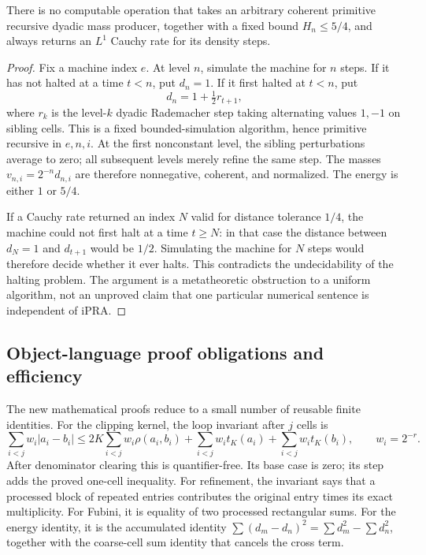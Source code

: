 \begin{proposition}
\label{m:no_rate}
There is no computable operation that takes an arbitrary coherent
primitive recursive dyadic mass producer, together with a fixed bound
\(H_n\le5/4\), and always returns an \(L^1\) Cauchy rate for its density steps.
\end{proposition}

\begin{proof}
Fix a machine index \(e\).  At level \(n\), simulate the machine for \(n\)
steps.  If it has not halted at a time \(t<n\), put \(d_n=1\).
If it first halted at \(t<n\), put
\[
 d_n=1+\tfrac12 r_{t+1},
 \]
where \(r_k\) is the level-\(k\) dyadic Rademacher step taking alternating
values \(1,-1\) on sibling cells.  This is a fixed bounded-simulation
algorithm, hence primitive recursive in \(e,n,i\).
At the first nonconstant level, the sibling perturbations average to zero;
all subsequent levels merely refine the same step.  The masses
\(v_{n,i}=2^{-n}d_{n,i}\) are therefore nonnegative, coherent, and normalized.
The energy is either \(1\) or \(5/4\).

If a Cauchy rate returned an index \(N\) valid for distance tolerance \(1/4\),
the machine could not first halt at a time \(t\ge N\): in that case the
distance between \(d_N=1\) and \(d_{t+1}\) would be \(1/2\).
Simulating the machine for \(N\) steps would therefore decide whether it
ever halts.  This contradicts the undecidability of the halting problem.
The argument is a metatheoretic obstruction to a uniform algorithm, not an
unproved claim that one particular numerical sentence is independent of
iPRA.
\end{proof}

\subsection{Object-language proof obligations and efficiency}

The new mathematical proofs reduce to a small number of reusable finite
identities.  For the clipping kernel, the loop invariant after \(j\) cells is
\[
 \sum_{i<j}w_i|a_i-b_i|
 \le 2K\sum_{i<j}w_i\rho(a_i,b_i)
      +\sum_{i<j}w_i t_K(a_i)+\sum_{i<j}w_i t_K(b_i),
 \qquad w_i=2^{-r}.
 \tag{M25}
\]
After denominator clearing this is quantifier-free.  Its base case is zero;
its step adds the proved one-cell inequality.  For refinement, the invariant
says that a processed block of repeated entries contributes the original
entry times its exact multiplicity.  For Fubini, it is equality of two
processed rectangular sums.  For the energy identity, it is the accumulated
identity
\(\sum(d_m-d_n)^2=\sum d_m^2-\sum d_n^2\), together with the
coarse-cell sum identity that cancels the cross term.

